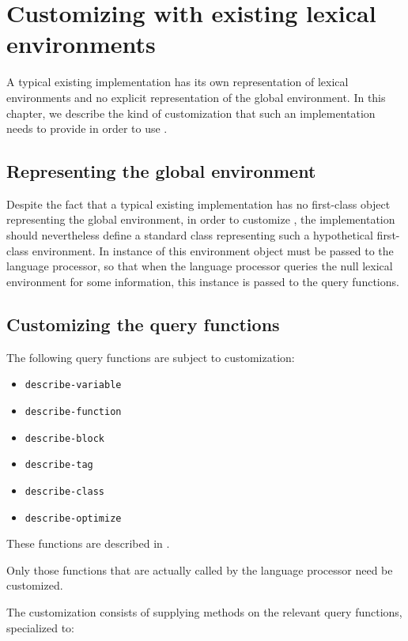 \chapter{Customizing with existing lexical environments}

A typical existing \commonlisp{} implementation has its own
representation of lexical environments and no explicit representation
of the global environment.  In this chapter, we describe the kind of
customization that such an implementation needs to provide in order to
use \sysname{}.

\section{Representing the global environment}
\label{sec-representing-the-global-environment}

Despite the fact that a typical existing implementation has no
first-class object representing the global environment, in order to
customize \sysname{}, the implementation should nevertheless define a
standard class representing such a hypothetical first-class
environment.  In instance of this environment object must be passed to
the language processor, so that when the language processor queries
the null lexical environment for some information, this instance is
passed to the query functions.

\section{Customizing the query functions}

The following query functions are subject to customization:

\begin{itemize}
\item \texttt{describe-variable}
\item \texttt{describe-function}
\item \texttt{describe-block}
\item \texttt{describe-tag}
\item \texttt{describe-class}
\item \texttt{describe-optimize}
\end{itemize}

These functions are described in .

Only those functions that are actually called by the language
processor need be customized.

The customization consists of supplying methods on the relevant query
functions, specialized to:

